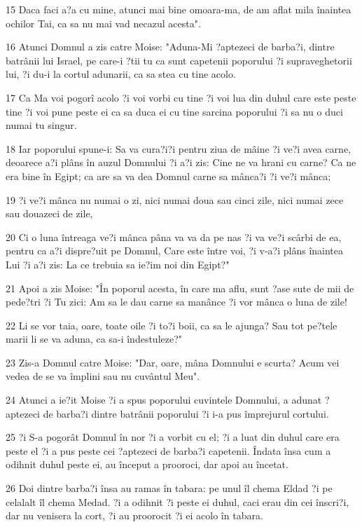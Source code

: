 \par 15 Daca faci a?a cu mine, atunci mai bine omoara-ma, de am aflat mila înaintea ochilor Tai, ca sa nu mai vad necazul acesta".
\par 16 Atunci Domnul a zis catre Moise: "Aduna-Mi ?aptezeci de barba?i, dintre batrânii lui Israel, pe care-i ?tii tu ca sunt capetenii poporului ?i supraveghetorii lui, ?i du-i la cortul adunarii, ca sa stea cu tine acolo.
\par 17 Ca Ma voi pogorî acolo ?i voi vorbi cu tine ?i voi lua din duhul care este peste tine ?i voi pune peste ei ca sa duca ei cu tine sarcina poporului ?i sa nu o duci numai tu singur.
\par 18 Iar poporului spune-i: Sa va cura?i?i pentru ziua de mâine ?i ve?i avea carne, deoarece a?i plâns în auzul Domnului ?i a?i zis: Cine ne va hrani cu carne? Ca ne era bine în Egipt; ca are sa va dea Domnul carne sa mânca?i ?i ve?i mânca;
\par 19 ?i ve?i mânca nu numai o zi, nici numai doua sau cinci zile, nici numai zece sau douazeci de zile,
\par 20 Ci o luna întreaga ve?i mânca pâna va va da pe nas ?i va ve?i scârbi de ea, pentru ca a?i dispre?uit pe Domnul, Care este între voi, ?i v-a?i plâns înaintea Lui ?i a?i zis: La ce trebuia sa ie?im noi din Egipt?"
\par 21 Apoi a zis Moise: "În poporul acesta, în care ma aflu, sunt ?ase sute de mii de pede?tri ?i Tu zici: Am sa le dau carne sa manânce ?i vor mânca o luna de zile!
\par 22 Li se vor taia, oare, toate oile ?i to?i boii, ca sa le ajunga? Sau tot pe?tele marii li se va aduna, ca sa-i îndestuleze?"
\par 23 Zis-a Domnul catre Moise: "Dar, oare, mâna Domnului e scurta? Acum vei vedea de se va împlini sau nu cuvântul Meu".
\par 24 Atunci a ie?it Moise ?i a spus poporului cuvintele Domnului, a adunat ?aptezeci de barba?i dintre batrânii poporului ?i i-a pus împrejurul cortului.
\par 25 ?i S-a pogorât Domnul în nor ?i a vorbit cu el; ?i a luat din duhul care era peste el ?i a pus peste cei ?aptezeci de barba?i capetenii. Îndata însa cum a odihnit duhul peste ei, au început a prooroci, dar apoi au încetat.
\par 26 Doi dintre barba?i însa au ramas în tabara: pe unul îl chema Eldad ?i pe celalalt îl chema Medad. ?i a odihnit ?i peste ei duhul, caci erau din cei înscri?i, dar nu venisera la cort, ?i au proorocit ?i ei acolo în tabara.
